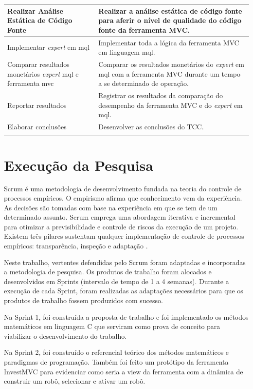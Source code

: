 \begin{center}
\begin{longtable}{| p{8cm} | p{8cm} |}
	Realizar Análise Estática de Código Fonte & Realizar a análise estática de código fonte para aferir o nível de qualidade do código fonte da ferramenta MVC.\\ \hline
	Implementar \textit{expert} em mql & Implementar toda a lógica da ferramenta MVC em linguagem mql.\\ \hline
	Comparar resultados monetários \textit{expert} mql e ferramenta mvc & Comparar os resultados monetários do \textit{expert} em mql com a ferramenta MVC durante um tempo a se determinado de operação.\\ \hline
	Reportar resultados & Registrar os resultados da comparação do desempenho da ferramenta MVC e do \textit{expert} em mql.\\ \hline
	Elaborar conclusões & Desenvolver as conclusões do TCC.\\
\label{atividadeMetologia}
\end{longtable}
\end{center}

\section{Execução da Pesquisa}

Scrum é uma metodologia de desenvolvimento fundada na teoria do controle de processos empíricos. O empirismo afirma que conhecimento vem da experiência. As decisões são tomadas com base na experiência em que se tem de um determinado assunto. Scrum emprega uma abordagem iterativa e incremental para otimizar a previsibilidade e controle de riscos da execução de um projeto. Existem três pilares sustentam qualquer implementação de controle de processos empíricos: transparência, inspeção e adaptação \cite[pág.~4]{schwaber2013}.

Neste trabalho, vertentes defendidas pelo Scrum foram adaptadas e incorporadas a metodologia de pesquisa. Os produtos de  trabalho foram alocados e desenvolvidos em Sprints (intervalo de tempo de 1 a 4 semanas). Durante a execução de cada Sprint, foram realizadas as adaptações necessários para que os produtos de trabalho fossem produzidos com sucesso.

Na Sprint 1, foi construída a proposta de trabalho e foi implementado os métodos matemáticos em linguagem C que serviram como prova de conceito para viabilizar o desenvolvimento do trabalho.

Na Sprint 2, foi construído o referencial teórico dos métodos matemáticos e paradigmas de programação. Também foi feito um protótipo da ferramenta InvestMVC para evidenciar como seria a view da ferramenta com a dinâmica de construir um robô, selecionar e ativar um robô.

